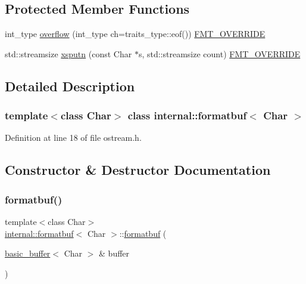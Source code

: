 \subsection*{Protected Member Functions}
\begin{DoxyCompactItemize}
\item 
int\+\_\+type \hyperlink{classinternal_1_1formatbuf_a8bd06d6e45ceeb2e89956359e47aa9b7}{overflow} (int\+\_\+type ch=traits\+\_\+type\+::eof()) \hyperlink{core_8h_a023c6c178e254d81d578b90921804b1c}{F\+M\+T\+\_\+\+O\+V\+E\+R\+R\+I\+DE}
\item 
std\+::streamsize \hyperlink{classinternal_1_1formatbuf_a59b8ab9a4c9907e4d6bae3861832e687}{xsputn} (const Char $\ast$s, std\+::streamsize count) \hyperlink{core_8h_a023c6c178e254d81d578b90921804b1c}{F\+M\+T\+\_\+\+O\+V\+E\+R\+R\+I\+DE}
\end{DoxyCompactItemize}


\subsection{Detailed Description}
\subsubsection*{template$<$class Char$>$\newline
class internal\+::formatbuf$<$ Char $>$}



Definition at line 18 of file ostream.\+h.



\subsection{Constructor \& Destructor Documentation}
\mbox{\label{classinternal_1_1formatbuf_a3a169a95f0631ab904bcecc66e420470}} 
\subsubsection{\texorpdfstring{formatbuf()}{formatbuf()}}
{\footnotesize\ttfamily template$<$class Char$>$ \\
\hyperlink{classinternal_1_1formatbuf}{internal\+::formatbuf}$<$ Char $>$\+::\hyperlink{classinternal_1_1formatbuf}{formatbuf} (\begin{DoxyParamCaption}\item[{\hyperlink{classinternal_1_1basic__buffer}{basic\+\_\+buffer}$<$ Char $>$ \&}]{buffer }\end{DoxyParamCaption})\hspace{0.3cm}{\ttfamily [inline]}}



